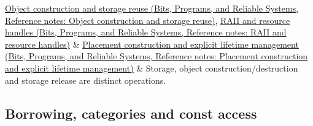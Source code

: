 {\begin{longtable}[]
\href{../01-Bits-Programs-and-Reliable-Systems/main.pdf\#nameddest=appendix-a82f9c438857}{Object construction and storage reuse (Bits, Programs, and Reliable Systems, Reference notes: Object construction and storage reuse)}, \href{../01-Bits-Programs-and-Reliable-Systems/main.pdf\#nameddest=appendix-69739d3ab49b}{RAII and resource handles (Bits, Programs, and Reliable Systems, Reference notes: RAII and resource handles)} & \href{../01-Bits-Programs-and-Reliable-Systems/main.pdf\#nameddest=appendix-f56c3e43fd4e}{Placement construction and explicit lifetime management (Bits, Programs, and Reliable Systems, Reference notes: Placement construction and explicit lifetime management)} & Storage, object construction/destruction and storage release are distinct operations. \\
\end{longtable}
}

\subsection{Borrowing, categories and const access}\label{appendix-4ad47bdd269a-borrowing-categories-and-const-access}

\hypertarget{appendix-4ad47bdd269a-borrowing-categories-and-const-access}{}

